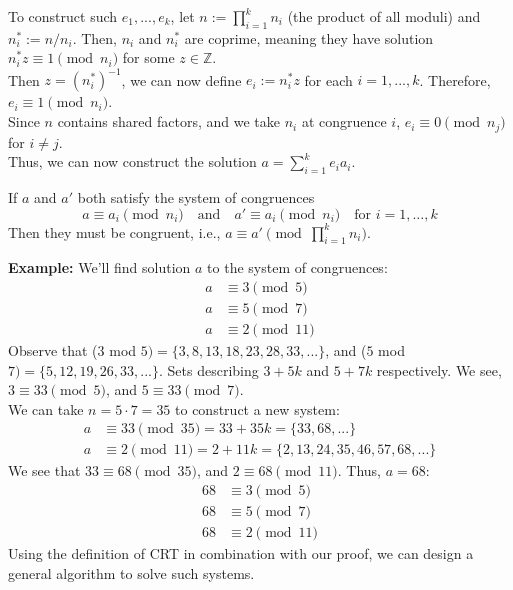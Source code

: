 \newpage

\begin{Proof}

\noindent
To construct such $e_1,...,e_k$, let $n := \prod_{i=1}^k n_i$ (the product of all moduli) and $n_i^* := n/n_i$. Then, $n_i$ and $n_i^*$ are coprime, meaning they have solution $n_i^*z\equiv 1\pmod{n_i}$ for some $z\in\mathbb{Z}$.\\

\noindent
Then $z=(n_i^*)^{-1}$, we can now define $e_i := n_i^*z$ for each $i=1,...,k$. Therefore, $e_i\equiv 1\pmod{n_i}$.\\
Since $n$ contains shared factors, and we take $n_i$ at congruence $i$, $e_i\equiv 0\pmod{n_j}$ for $i\neq j$.\\

\noindent
Thus, we can now construct the solution $a = \sum_{i=1}^k e_ia_i$.

\end{Proof}
\begin{Proof}

    If \( a \) and \( a' \) both satisfy the system of congruences
    \[
    a \equiv a_i \pmod{n_i} \quad \text{and} \quad a' \equiv a_i \pmod{n_i} \quad \text{for } i = 1, \dots, k
    \]
    Then they must be congruent, i.e., \( a \equiv a' \pmod{\prod_{i=1}^k n_i} \).\\
    
    \noindent
\end{Proof}
\textbf{Example:} We'll find solution $a$ to the system of congruences:
\begin{align*}
    a &\equiv 3 \pmod{5} \\
    a &\equiv 5 \pmod{7} \\
    a &\equiv 2 \pmod{11}
\end{align*}
Observe that ($3$ mod $5)=\{3,8,13,18,23,28,33,...\}$, and ($5$ mod $7)=\{5,12,19,26,33,...\}$.
Sets describing $3+5k$ and $5+7k$ respectively. We see,  $3\equiv 33\pmod{5}$, and $5\equiv 33\pmod{7}$.\\

\noindent
We can take $n=5\cdot7=35$ to construct a new system:
\begin{align*}
    a &\equiv 33 \pmod{35} = 33+35k = \{33,68,...\} \\
    a &\equiv 2 \pmod{11} = 2+11k = \{2,13,24,35,46,57,68,...\}
\end{align*}
We see that $33\equiv 68\pmod{35}$, and $2\equiv 68\pmod{11}$. Thus, $a=68$:
\begin{align*}
    68 &\equiv 3 \pmod{5} \\
    68 &\equiv 5 \pmod{7} \\
    68 &\equiv 2 \pmod{11}
\end{align*}
Using the definition of CRT in combination with our proof, we can design a general algorithm to solve such systems.

